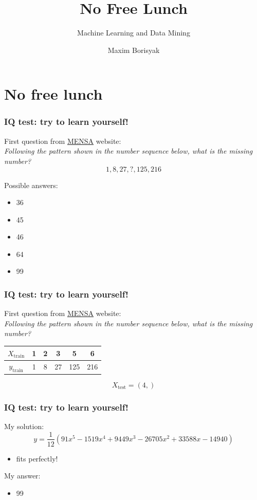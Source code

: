 \documentclass[mathserif, aspectratio=43]{beamer}
\title{No Free Lunch}
\subtitle{Machine Learning and Data Mining}
\author{Maxim Borisyak}
\institute{National Research University Higher School of Economics (HSE)}
\begin{document}
\begin{frame}[plain]
	\titlepage
\end{frame}

\section{No free lunch}



\begin{frame}[fragile]
\frametitle{IQ test: try to learn yourself!}
First question from \href{https://www.mensa.org/workout/questions}{MENSA} website:\\
\textit{Following the pattern shown in the number sequence below, what is the missing number?}
$$1, 8, 27, ?, 125, 216$$

Possible answers:
\begin{itemize}
\item 36
\item 45
\item 46
\item 64
\item 99
\end{itemize}

\end{frame}


\begin{frame}[fragile]
\frametitle{IQ test: try to learn yourself!}
First question from \href{https://www.mensa.org/workout/questions}{MENSA} website:\\
\textit{Following the pattern shown in the number sequence below, what is the missing number?}
\begin{center}
\begin{tabular}{c | c c c c c}
$X_{\mathrm{train}}$ & 1 & 2 & 3 & 5 & 6\\
\hline
$y_{\mathrm{train}}$ & 1 & 8 & 27 & 125 & 216
\end{tabular}
\end{center}
\vspace*{5mm}
$$X_\mathrm{test} = (4, )$$


\end{frame}


\begin{frame}[fragile]
\frametitle{IQ test: try to learn yourself!}
My solution:
$$y = \frac{1}{12}(91 x^5 - 1519 x^4 + 9449 x^3 - 26705 x^2 + 33588 x - 14940)$$

\begin{itemize}
\item fits perfectly!
\end{itemize}
My answer:
\begin{itemize}
\item 99
\end{itemize}

\end{frame}
\end{document}
